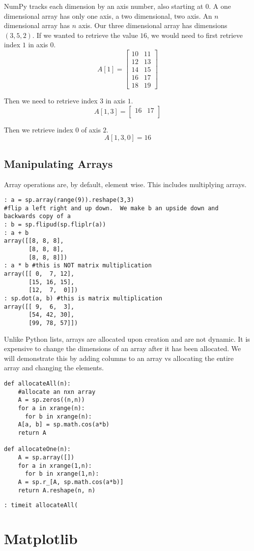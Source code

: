 NumPy tracks each dimension by an axis number, also starting at $0$.  A one dimensional array has only one axis, a two dimensional, two axis.  An $n$ dimensional array has $n$ axis.  Our three dimensional array has dimensions $(3,5,2)$.  If we wanted to retrieve the value $16$, we would need to first retrieve index $1$ in axis $0$.
\[
A[1] = \begin{bmatrix}
10 & 11 \\
12 & 13 \\
14 & 15 \\
16 & 17 \\
18 & 19
\end{bmatrix}
\]

Then we need to retrieve index $3$ in axis $1$.
\[
A[1,3] = \begin{bmatrix}
         16 & 17 \\
         \end{bmatrix}
\]

Then we retrieve index $0$ of axis $2$.
\[
A[1,3,0] = 16
\]

\subsection*{Manipulating Arrays}
Array operations are, by default, element wise.  This includes multiplying arrays.

\begin{lstlisting}[style=python]
: a = sp.array(range(9)).reshape(3,3)
#flip a left right and up down.  We make b an upside down and backwards copy of a
: b = sp.flipud(sp.fliplr(a))
: a + b
array([[8, 8, 8],
       [8, 8, 8],
       [8, 8, 8]])
: a * b #this is NOT matrix multiplication
array([[ 0,  7, 12],
       [15, 16, 15],
       [12,  7,  0]])
: sp.dot(a, b) #this is matrix multiplication
array([[ 9,  6,  3],
       [54, 42, 30],
       [99, 78, 57]])
\end{lstlisting}

Unlike Python lists, arrays are allocated upon creation and are not dynamic.  It is expensive to change the dimensions of an array after it has been allocated.  We will demonstrate this by adding columns to an array vs allocating the entire array and changing the elements.

\begin{lstlisting}[style=python]
def allocateAll(n):
    #allocate an nxn array
    A = sp.zeros((n,n))
    for a in xrange(n):
      for b in xrange(n):
	A[a, b] = sp.math.cos(a*b)
    return A

def allocateOne(n):
    A = sp.array([])
    for a in xrange(1,n):
      for b in xrange(1,n):
	A = sp.r_[A, sp.math.cos(a*b)]
    return A.reshape(n, n)
\end{lstlisting}

\begin{lstlisting}[style=python]
: timeit allocateAll(
\end{lstlisting}



\section*{Matplotlib}


